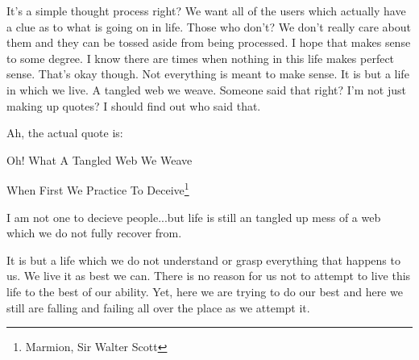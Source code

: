 

It's a simple thought process right? We want all of the users which actually
have a clue as to what is going on in life. Those who don't? We don't really
care about them and they can be tossed aside from being processed. I hope that
makes sense to some degree. I know there are times when nothing in this life
makes perfect sense. That's okay though. Not everything is meant to make sense.
It is but a life in which we live. A tangled web we weave. Someone said that
right? I'm not just making up quotes? I should find out who said that.

Ah, the actual quote is:

\begin{displayquote}
Oh! What A Tangled Web We Weave 

When First We Practice To Deceive\footnote{Marmion, Sir Walter Scott}
\end{displayquote}

I am not one to decieve people...but life is still an tangled up mess of a web
which we do not fully recover from.

It is but a life which we do not understand or grasp everything that happens to
us. We live it as best we can. There is no reason for us not to attempt to live
this life to the best of our ability. Yet, here we are trying to do our best and
here we still are falling and failing all over the place as we attempt it.